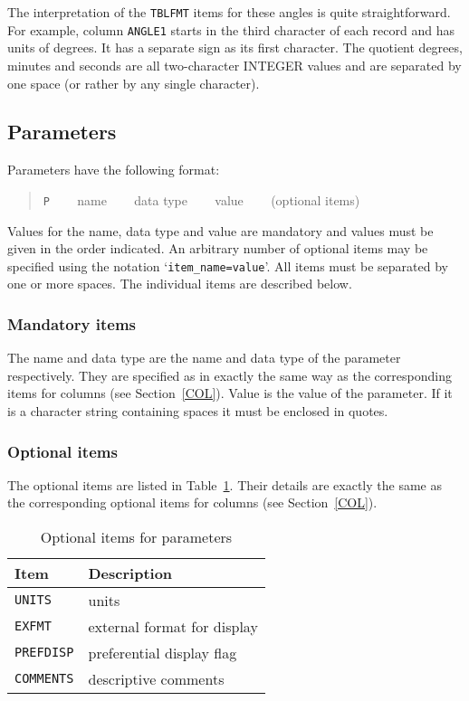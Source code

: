 \documentclass[twoside,11pt]{starlink}
\begin{document}
The interpretation of the \texttt{TBLFMT} items for these angles is quite
straightforward.  For example, column \texttt{ANGLE1} starts in the third
character of each record and has units of degrees.  It has a separate
sign as its first character.  The quotient degrees, minutes and
seconds are all two-character INTEGER values and are separated by
one space (or rather by any single character).

\subsection{Parameters \label{PAR}}

Parameters have the following format:

\begin{quote}
\texttt{P} ~~~ name ~~~ data type ~~~ value ~~~ (optional items)
\end{quote}

Values for the name, data type and value are mandatory and values
must be given in the order indicated.  An arbitrary number of optional
items may be specified using the notation `\texttt{item\_name=value}'.
All items must be separated by one or more spaces.  The individual
items are described below.

\subsubsection{Mandatory items}

The name and data type are the name and data type of the parameter
respectively.  They are specified as in exactly the same way as the
corresponding items for columns (see Section~\ref{COL}).  Value is the
value of the parameter.  If it is a character string containing spaces
it must be enclosed in quotes.

\subsubsection{Optional items}

The optional items are listed in Table~\ref{PAR_OPT}. Their details
are exactly the same as the corresponding optional items for columns
(see Section~\ref{COL}).

\begin{table}[htbp]

\begin{center}
\begin{tabular}{ll}
Item           & Description                   \\ \hline
\texttt{UNITS}    & units                         \\
\texttt{EXFMT}    & external format for display   \\
\texttt{PREFDISP} & preferential display flag     \\
\texttt{COMMENTS} & descriptive comments          \\
\end{tabular}

\caption{Optional items for parameters \label{PAR_OPT} }

\end{center}
\end{table}
\end{document}
